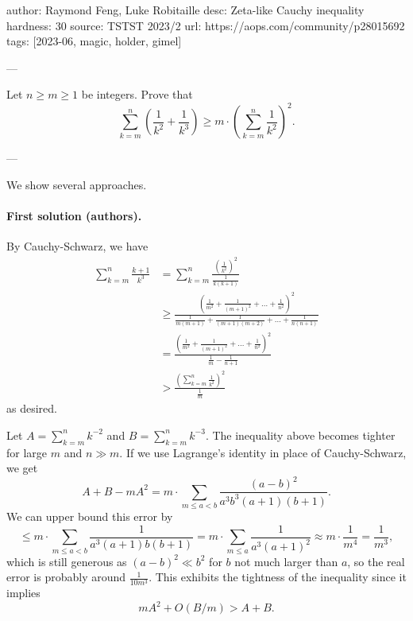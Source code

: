 author: Raymond Feng, Luke Robitaille
desc: Zeta-like Cauchy inequality
hardness: 30
source: TSTST 2023/2
url: https://aops.com/community/p28015692
tags: [2023-06, magic, holder, gimel]

---

Let $n \ge m \ge 1$ be integers.
Prove that
\[ \sum_{k=m}^n \left( \frac{1}{k^2} + \frac{1}{k^3} \right)
  \ge m \cdot \left( \sum_{k=m}^n \frac{1}{k^2} \right)^2. \]

---

We show several approaches.

\paragraph{First solution (authors).}
By Cauchy-Schwarz, we have
\begin{align*}
  \sum_{k=m}^n\frac{k+1}{k^3}
  &= \sum_{k=m}^n\frac{\left(\frac1{k^2}\right)^2}{\frac1{k(k+1)}} \\
  &\geq
  \frac{
  \left( \frac{1}{m^2} + \frac{1}{(m+1)^2} + \dots + \frac{1}{n^2} \right)^2
  }
  {
    \frac{1}{m(m+1)} + \frac{1}{(m+1)(m+2)} + \dots + \frac{1}{n(n+1)}
  } \\
  &=
  \frac{
  \left( \frac{1}{m^2} + \frac{1}{(m+1)^2} + \dots + \frac{1}{n^2} \right)^2
  }
  { \frac 1m - \frac{1}{n+1} } \\
  &> \frac{\left(\sum_{k=m}^n\frac1{k^2}\right)^2}{\frac1m}
\end{align*}
as desired.

\begin{remark*}
  Let $A = \sum_{k=m}^n k^{-2}$ and $B = \sum_{k=m}^n k^{-3}$. The inequality
  above becomes tighter for large $m$ and $n \gg m$. If we use Lagrange's
  identity in place of Cauchy-Schwarz,
  we get \[ A+B-mA^2=m\cdot\sum_{m\leq a<b} \frac{(a-b)^2}{a^3b^3(a+1)(b+1)}.\]
  We can upper bound this error by
  \[
    \leq m\cdot\sum_{m\leq a<b}\frac1{a^3(a+1)b(b+1)}
    =m\cdot\sum_{m\leq a}\frac1{a^3(a+1)^2}
    \approx m\cdot\frac1{m^4} = \frac1{m^3},
  \]
  which is still generous as $(a-b)^2 \ll b^2$
  for $b$ not much larger than $a$,
  so the real error is probably around $\frac1{10m^3}$.
  This exhibits the tightness of the inequality since it implies
  \[ mA^2+O(B/m) > A+B. \]
\end{remark*}

